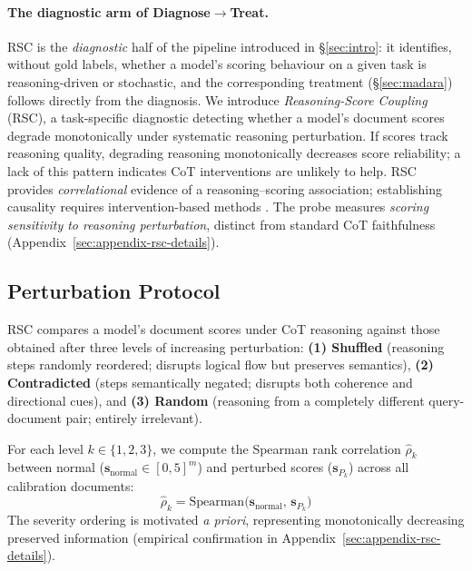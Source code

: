 \documentclass[11pt]{article}
\theoremstyle{definition}
\begin{document}
\paragraph{The diagnostic arm of Diagnose$\to$Treat.}
RSC is the \emph{diagnostic} half of the pipeline introduced in \S\ref{sec:intro}: it identifies, without gold labels, whether a model's scoring behaviour on a given task is reasoning-driven or stochastic, and the corresponding treatment (\S\ref{sec:madara}) follows directly from the diagnosis. We introduce \emph{Reasoning-Score Coupling} (RSC), a task-specific diagnostic detecting whether a model's document scores degrade monotonically under systematic reasoning perturbation. If scores track reasoning quality, degrading reasoning monotonically decreases score reliability; a lack of this pattern indicates CoT interventions are unlikely to help. RSC provides \emph{correlational} evidence of a reasoning--scoring association; establishing causality requires intervention-based methods \citep{paul2024making}. The probe measures \emph{scoring sensitivity to reasoning perturbation}, distinct from standard CoT faithfulness (Appendix~\ref{sec:appendix-rsc-details}).

\subsection{Perturbation Protocol}
\label{subsec:rsc-protocol}

RSC compares a model's document scores under CoT reasoning against those obtained after three levels of increasing perturbation: \textbf{(1) Shuffled} (reasoning steps randomly reordered; disrupts logical flow but preserves semantics), \textbf{(2) Contradicted} (steps semantically negated; disrupts both coherence and directional cues), and \textbf{(3) Random} (reasoning from a completely different query-document pair; entirely irrelevant). 

For each level \(k \in \{1, 2, 3\}\), we compute the Spearman rank correlation \(\hat{\rho}_k\) between normal (\(\mathbf{s}_{\text{normal}} \in [0,5]^m\)) and perturbed scores (\(\mathbf{s}_{P_k}\)) across all calibration documents:
\begin{equation}
  \hat{\rho}_k = \text{Spearman}\bigl(\mathbf{s}_{\text{normal}},\,\mathbf{s}_{P_k}\bigr)
  \label{eq:rho-k}
\end{equation}
The severity ordering is motivated \emph{a priori}, representing monotonically decreasing preserved information (empirical confirmation in Appendix~\ref{sec:appendix-rsc-details}).
\end{document}
